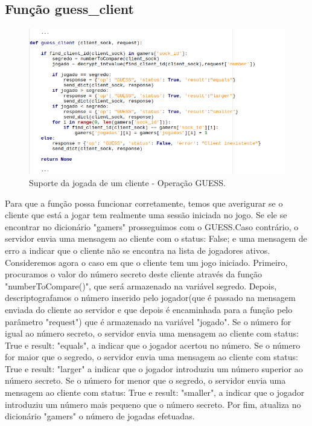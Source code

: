 \documentclass{report}
\begin{document}
\subsection{Função \textbf{guess\_client}}
\begin{figure}[H]
	\centering
	\includegraphics[scale=0.65]{guess_client}	
	\caption{Suporte da jogada de um cliente - Operação GUESS.}
\end{figure}

Para que a função possa funcionar corretamente, temos que averigurar se o cliente que está a jogar tem realmente uma sessão iniciada no jogo. Se ele se encontrar no dicionário "gamers" prosseguimos com o GUESS.Caso contrário, o servidor envia uma mensagem ao cliente com o status: False; e uma mensagem de erro a indicar que o cliente não se encontra na lista de jogadores ativos.
Consideremos agora o caso em que o cliente tem um jogo iniciado. Primeiro, procuramos o valor do número secreto deste cliente através da função "numberToCompare()", que será armazenado na variável segredo. Depois, descriptografamos o número inserido pelo jogador(que é passado na mensagem enviada do cliente ao servidor e que depois é encaminhada para a função pelo parâmetro "request") que é armazenado na variável "jogado".
Se o número for igual ao número secreto, o servidor envia uma mensagem ao cliente com status: True e result: "equals", a indicar que o jogador acertou no número.
Se o número for maior que o segredo, o servidor envia uma mensagem ao cliente com status: True e result: "larger" a indicar que o jogador introduziu um número superior ao número secreto.
Se o número for menor que o segredo, o servidor envia uma mensagem ao cliente com status: True e result: "smaller", a indicar que o jogador introduziu um número mais pequeno que o número secreto.
Por fim, atualiza no dicionário "gamers" o número de jogadas efetuadas.
\end{document}
